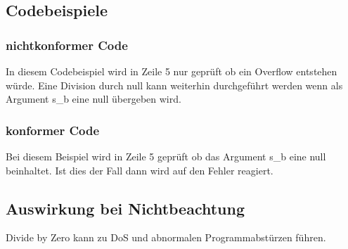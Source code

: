 \documentclass[12pt]{article}
\begin{document}
\subsection{Codebeispiele}
\subsubsection{nichtkonformer Code}


In diesem Codebeispiel wird in Zeile 5 nur geprüft ob ein Overflow entstehen würde. Eine Division durch null kann weiterhin durchgeführt werden wenn als Argument s\_b eine null übergeben wird.

 
\subsubsection{konformer Code}


Bei diesem Beispiel wird in Zeile 5 geprüft ob das Argument s\_b eine null beinhaltet. Ist dies der Fall dann wird auf den Fehler reagiert.

\subsection{Auswirkung bei Nichtbeachtung}
Divide by Zero kann zu DoS und abnormalen Programmabstürzen  führen.
\end{document}
